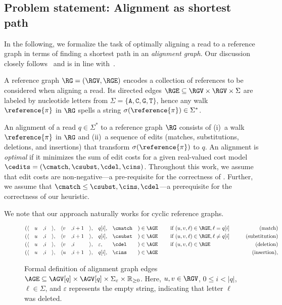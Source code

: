\subsection{Problem statement: Alignment as shortest path} \label{SEEDsec:task}
%
In the following, we formalize the task of optimally aligning a read to a
reference graph in terms of finding a shortest path in an \emph{alignment
graph}. Our discussion closely follows~\citep{ivanov2020astarix} and is in line
with~\citep{rautiainen_aligning_2017}.

%
A reference graph $\RG=(\RGV,\RGE)$ encodes a collection of references to be
considered when aligning a read. Its directed edges $\RGE \subseteq \RGV \times
\RGV \times \Sigma$ are labeled by nucleotide letters from $\Sigma =
\{\texttt{A},\texttt{C},\texttt{G},\texttt{T}\}$, hence any walk
$\reference{\pi}$ in $\RG$ spells a string $\sigma(\reference{\pi}) \in
\Sigma^*$.

An alignment of a read $q \in \Sigma^*$ to a reference graph $\RG$ consists of
(i)~a walk $\reference{\pi}$ in $\RG$ and (ii)~a sequence of edits (matches,
substitutions, deletions, and insertions) that transform
$\sigma(\reference{\pi})$ to $q$. An alignment is \emph{optimal} if it minimizes
the sum of edit costs for a given real-valued cost model $\cedits = (\cmatch,
\csubst,\cdel, \cins)$.
%
Throughout this work, we assume that edit costs are non-negative---a
pre-requisite for the correctness of \A. Further, we assume that $\cmatch \leq
\csubst, \cins, \cdel$---a prerequisite for the correctness of our heuristic.

We note that our approach naturally works for cyclic reference graphs.

\begin{figure}[t]
	\begin{alignat*}{20}
		(
			&\langle&& u &,& i   &\rangle&,
			&\langle&  v &,& i+1 &\rangle&,
			&&q[i],
			&&\cmatch
		&)&\in \AGE
		&& \quad \text{ if } (u,v,\ell) \in \RGE, \ell = q[i] & \qquad \text{(match)}\\
		(
			&\langle&& u &,& i   &\rangle&,
			&\langle&  v &,& i+1 &\rangle&,
			&&q[i],
			&&\csubst
		&) &\in \AGE
		&& \quad \text{ if } (u,v,\ell) \in \RGE, \ell \neq q[i] & \qquad \text{(substitution)}\\
		(
			&\langle&& u &,& i &\rangle&,
			&\langle&  v &,& i &\rangle&,
			&&\varepsilon,
			&&\cdel
		&) &\in \AGE
		&& \quad \text{ if } (u,v,\ell) \in \RGE & \qquad \text{(deletion)}\\
		(
			&\langle&& u &,& i   &\rangle&,
			&\langle&  u &,& i+1 &\rangle&,
			&&q[i],
			&&\cins
		&) &\in \AGE
		&& \quad & \qquad \text{(insertion)},
	\end{alignat*}
	\caption{Formal definition of alignment graph edges $\AGE \subseteq \AGV[q]
	\times \AGV[q] \times \Sigma_\varepsilon \times \mathbb{R}_{\geq 0}$. Here,
	$u,v \in \RGV$, $0 \leq i < |q|$, $\ell \in \Sigma$, and $\varepsilon$
	represents the empty string, indicating that letter $\ell$ was deleted.}
	\label{SEEDfig:graph-edges}
\end{figure}

